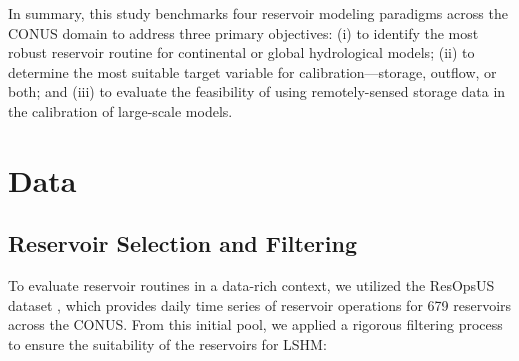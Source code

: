 \documentclass[hess, manuscript]{copernicus}
\begin{document}
In summary, this study benchmarks four reservoir modeling paradigms across the CONUS domain to address three primary objectives: (i) to identify the most robust reservoir routine for continental or global hydrological models; (ii) to determine the most suitable target variable for calibration—storage, outflow, or both; and (iii) to evaluate the feasibility of using remotely-sensed storage data in the calibration of large-scale models.



\section{Data}
\label{sec:data}

\subsection{Reservoir Selection and Filtering}
\label{sec:reservoir_selection}

To evaluate reservoir routines in a data-rich context, we utilized the ResOpsUS dataset \citep{Steyaert2022, Steyaert2024}, which provides daily time series of reservoir operations for 679 reservoirs across the CONUS. From this initial pool, we applied a rigorous filtering process to ensure the suitability of the reservoirs for LSHM:
\end{document}

